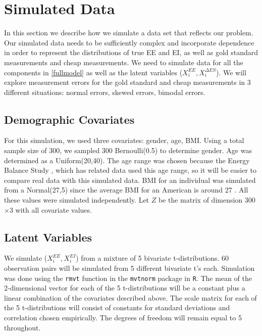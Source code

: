 \documentclass[11pt]{article}\usepackage[]{graphicx}\usepackage[]{color}
\begin{document}
\section{Simulated Data}

In this section we describe how we simulate a data set that reflects our problem. Our simulated data needs to be sufficiently complex and incorporate dependence in order to represent the distributions of true EE and EI, as well as gold standard measurements and cheap measurements. We need to simulate data for all the components in \eqref{fullmodel} as well as the latent variables ($X_i^{EE}, X_i^{\Delta ES}$). We will explore measurement errors for the gold standard and cheap measurements in 3 different situations: normal errors, skewed errors, bimodal errors. 

\subsection{Demographic Covariates}

For this simulation, we used three covariates: gender, age, BMI. Using a total sample size of 300, we sampled 300 Bernoulli(0.5) to determine gender. Age was determined as a Uniform(20,40). The age range was chosen because the Energy Balance Study \cite{hand}, which has related data used this age range, so it will be easier to compare real data with this simulated data. BMI for an individual was simulated from a Normal(27,5) since the average BMI for an American is around 27 \cite{cdc}. All these values were simulated independently. Let $Z$ be the matrix of dimension 300$\times$3 with all covariate values.


\subsection{Latent Variables}

We simulate ($X_i^{EE}, X_i^{EI}$) from a mixture of 5 bivariate t-distributions. 60 observation pairs will be simulated from 5 different bivariate t's each. Simulation was done using the \texttt{rmvt} function in the \texttt{mvtnorm} package in \texttt{R}. The mean of the 2-dimensional vector for each of the 5 t-distributions will be a constant plus a linear combination of the covariates described above. The scale matrix for each of the 5 t-distributions will consist of constants for standard deviations and correlation chosen empirically. The degrees of freedom will remain equal to 5 throughout. 
\end{document}
